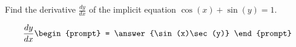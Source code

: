 \documentclass{ximera}
\author{Gregory Hartman \and Matthew Carr}
\begin{document}
\begin{exercise}



Find the derivative $\frac{dy}{dx}$ of the implicit equation $\cos(x)+\sin(y)=1$.

\[
\frac{dy}{dx}
\begin{prompt}
= \answer{\sin(x)\sec(y)}
\end{prompt}
\]

\end{exercise}
\end{document}
